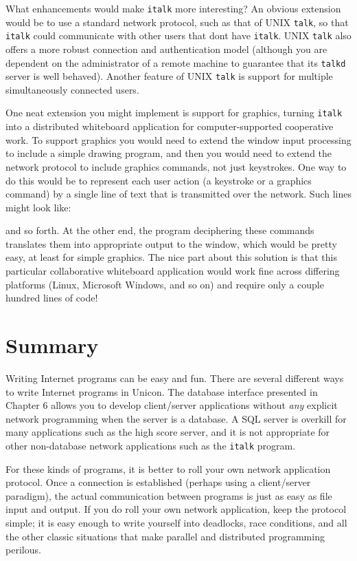 What enhancements would make \texttt{italk} more interesting? An
obvious extension would be to use a standard network protocol,
such as that of UNIX \texttt{talk}, so that \texttt{italk} could
communicate with other users that don{\textquotesingle}t have
\texttt{italk}. UNIX \texttt{talk} also offers a more robust connection
and authentication model (although you are dependent on the
administrator of a remote machine to guarantee that its \texttt{talkd}
server is well behaved). Another feature of UNIX \texttt{talk} is
support for multiple simultaneously connected users.

One neat extension you might implement is support for
graphics, turning \texttt{italk} into a distributed whiteboard
application for computer-supported cooperative work. To support
graphics you would need to extend the window input processing to
include a simple drawing program, and then you would need to extend the
network protocol to include graphics commands, not just keystrokes. One
way to do this would be to represent each user action (a keystroke or a
graphics command) by a single line of text that is transmitted over the
network. Such lines might look like:


\noindent
and so forth. At the other end, the program deciphering these commands
translates them into appropriate output to the window, which would be
pretty easy, at least for simple graphics. The nice part about this
solution is that this particular collaborative whiteboard application
would work fine across differing platforms (Linux, Microsoft Windows,
and so on) and require only a couple hundred lines of code!

\section*{Summary}

Writing Internet programs can be easy and fun. There are several
different ways to write Internet programs in Unicon. The
database interface presented in Chapter 6 allows you to
develop client/server applications without \textit{any} explicit
network programming when the server is a database. A SQL
server is overkill for many applications such as the high score server,
and it is not appropriate for other non-database network applications
such as the \texttt{italk} program.

For these kinds of programs, it is better to {\textquotedbl}roll your
own{\textquotedbl} network application protocol. Once a connection is
established (perhaps using a client/server paradigm), the actual
communication between programs is just as easy as file input and
output. If you do roll your own network application, keep the protocol
simple; it is easy enough to write yourself into deadlocks, race
conditions, and all the other classic situations that make parallel and
distributed programming perilous.

